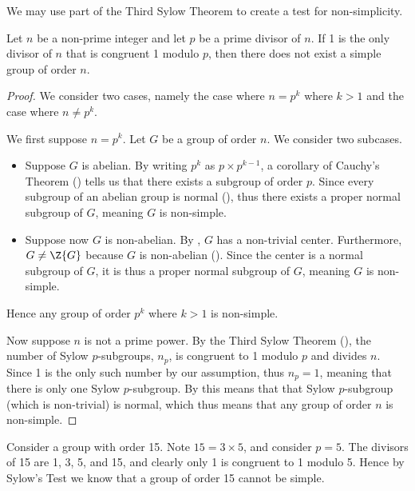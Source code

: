 We may use part of the Third Sylow Theorem to create a test for non-simplicity.
\begin{theorem}
    Let $n$ be a non-prime integer and let $p$ be a prime divisor of $n$. If 1 is the only divisor of $n$ that is congruent 1 modulo $p$, then there does not exist a simple group of order $n$.
\end{theorem}
\begin{proof}
    We consider two cases, namely the case where $n=p^k$ where $k>1$ and the case where $n \neq p^k$.
    
    We first suppose $n = p^k$. Let $G$ be a group of order $n$. We consider two subcases.
    \begin{itemize}
        \item Suppose $G$ is abelian. By writing $p^k$ as $p \times p^{k-1}$, a corollary of Cauchy's Theorem () tells us that there exists a subgroup of order $p$. Since every subgroup of an abelian group is normal (), thus there exists a proper normal subgroup of $G$, meaning $G$ is non-simple.
        \item Suppose now $G$ is non-abelian. By , $G$ has a non-trivial center. Furthermore, $G \neq \Z{G}$ because $G$ is non-abelian (). Since the center is a normal subgroup of $G$, it is thus a proper normal subgroup of $G$, meaning $G$ is non-simple.
    \end{itemize}
    Hence any group of order $p^k$ where $k > 1$ is non-simple.

    Now suppose $n$ is not a prime power. By the Third Sylow Theorem (), the number of Sylow $p$-subgroups, $n_p$, is congruent to 1 modulo $p$ and divides $n$. Since 1 is the only such number by our assumption, thus $n_p = 1$, meaning that there is only one Sylow $p$-subgroup. By  this means that that Sylow $p$-subgroup (which is non-trivial) is normal, which thus means that any group of order $n$ is non-simple.
\end{proof}
\begin{example}
    Consider a group with order 15. Note $15 = 3 \times 5$, and consider $p = 5$. The divisors of 15 are 1, 3, 5, and 15, and clearly only 1 is congruent to 1 modulo 5. Hence by Sylow's Test we know that a group of order 15 cannot be simple.
\end{example}

